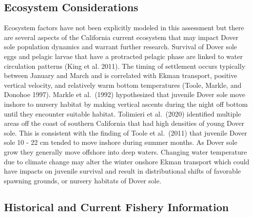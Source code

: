 \documentclass[11pt,
  english,
  a4paper,
]{article}
\begin{document}
\hypertarget{ecosystem-considerations-1}{%
\subsection{Ecosystem Considerations}\label{ecosystem-considerations-1}}

\leavevmode\tagmcend\tagstructend


Ecosystem factors have not been explicitly modeled in this assessment but there are several aspects of the California current ecosystem that may impact Dover sole population dynamics and warrant further research. Survival of Dover sole eggs and pelagic larvae that have a protracted pelagic phase are linked to water circulation patterns {(King et al. 2011)\leavevmode\tagmcend\tagstructend}. The timing of settlement occurs typically between January and March and is correlated with Ekman transport, positive vertical velocity, and relatively warm bottom temperatures {(Toole, Markle, and Donohoe 1997)\leavevmode\tagmcend\tagstructend}. Markle et al.~{(1992)\leavevmode\tagmcend\tagstructend} hypothesized that juvenile Dover sole move inshore to nursery habitat by making vertical ascents during the night off bottom until they encounter suitable habitat. Tolimieri et al.~{(2020)\leavevmode\tagmcend\tagstructend} identified multiple areas off the coast of southern California that had high densities of young Dover sole. This is consistent with the finding of Toole et al.~{(2011)\leavevmode\tagmcend\tagstructend} that juvenile Dover sole 10 - 22 cm tended to move inshore during summer months. As Dover sole grow they generally move offshore into deep waters. Changing water temperature due to climate change may alter the winter onshore Ekman transport which could have impacts on juvenile survival and result in distributional shifts of favorable spawning grounds, or nursery habitats of Dover sole.

\leavevmode\tagmcend\tagstructend\par


\hypertarget{historical-and-current-fishery-information}{%
\subsection{Historical and Current Fishery Information}\label{historical-and-current-fishery-information}}
\end{document}
